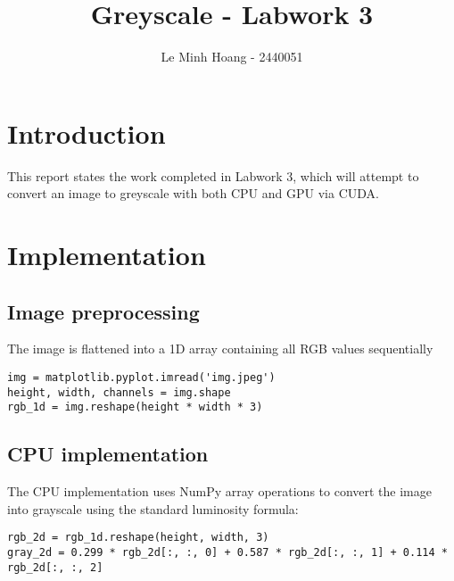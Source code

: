 \documentclass[12pt,a4paper]{cibb}
\title{\Large $\ $\\ \bf Greyscale - Labwork 3}
\author{\large Le Minh Hoang - 2440051}
\begin{document}
\renewcommand{\thefootnote}{}
\thispagestyle{myheadings}
\pagestyle{myheadings}
\section{Introduction}
\label{sec:SCIENTIFIC-BACKGROUND}
This report states the work completed in Labwork 3, which will attempt to convert an image to greyscale with both CPU and GPU via CUDA.


\section{Implementation}
\subsection{Image preprocessing}
The image is flattened into a 1D array containing all RGB values sequentially
\begin{lstlisting}
img = matplotlib.pyplot.imread('img.jpeg')
height, width, channels = img.shape
rgb_1d = img.reshape(height * width * 3)
\end{lstlisting}
\subsection{CPU implementation}
The CPU implementation uses NumPy array operations to convert the image into grayscale using the standard luminosity formula:
\begin{lstlisting}
rgb_2d = rgb_1d.reshape(height, width, 3)
gray_2d = 0.299 * rgb_2d[:, :, 0] + 0.587 * rgb_2d[:, :, 1] + 0.114 * rgb_2d[:, :, 2]
\end{lstlisting}
\end{document}
